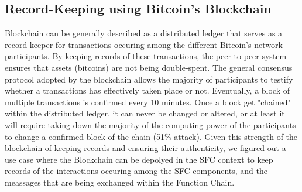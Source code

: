 \subsection{Record-Keeping using Bitcoin's Blockchain}
Blockchain can be generally described as a distributed ledger that serves as a record keeper for transactions occuring among the different Bitcoin's network participants. By keeping records of these transactions, the peer to peer system ensures that assets (bitcoins) are not being double-spent. The general consensus protocol adopted by the blockchain allows the majority of participants to testify whether a transactions has effectively taken place or not. Eventually, a block of multiple transactions is confirmed every 10 minutes. Once a block get "chained" within the distributed ledger, it can never be changed or altered, or at least it will require taking down the majority of the computing power of the participants to change a confirmed block of the chain (51\% attack). Given this strength of the blockchain of keeping records and ensuring their authenticity, we figured out a use case where the Blockchain can be depolyed in the SFC context to keep records of the interactions occuring among the SFC components, and the meassages that are being exchanged within the Function Chain.
